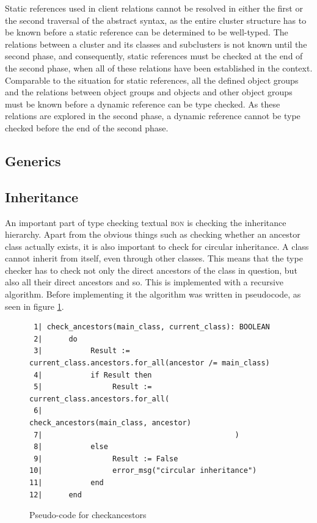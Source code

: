 Static references used in client relations cannot be resolved in either the first or the second traversal of the abstract syntax, as the entire cluster structure has to be known before a static reference can be determined to be well-typed. The relations between a cluster and its classes and subclusters is not known until the second phase, and consequently, static references must be checked at the end of the second phase, when all of these relations have been established in the context.
Comparable to the situation for static references, all the defined object groups and the relations between object groups and objects and other object groups must be known before a dynamic reference can be type checked. As these relations are explored in the second phase, a dynamic reference cannot be type checked before the end of the second phase.

\subsection{Generics}
\label{implementation-generics}

\subsection{Inheritance}
An important part of type checking textual \textsc{bon} is checking the inheritance hierarchy. Apart from the obvious things such as checking whether an ancestor class actually exists, it is also important to check for circular inheritance. A class cannot inherit from itself, even through other classes. This means that the type checker has to check not only the direct ancestors of the class in question, but also all their direct ancestors and so. This is implemented with a recursive algorithm. Before implementing it the algorithm was written in pseudocode, as seen in figure \ref{fig:check_ancestors_pseudocode}.
\begin{figure}[h]
{\footnotesize
\begin{verbatim}
 1| check_ancestors(main_class, current_class): BOOLEAN
 2|      do
 3|           Result := current_class.ancestors.for_all(ancestor /= main_class)
 4|           if Result then
 5|                Result := current_class.ancestors.for_all(
 6|                                            check_ancestors(main_class, ancestor)
 7|                                            )
 8|           else
 9|                Result := False
10|                error_msg("circular inheritance")
11|           end
12|      end
\end{verbatim}
}
\caption{Pseudo-code for check\textunderscore ancestors}
\label{fig:check_ancestors_pseudocode}
\end{figure}

